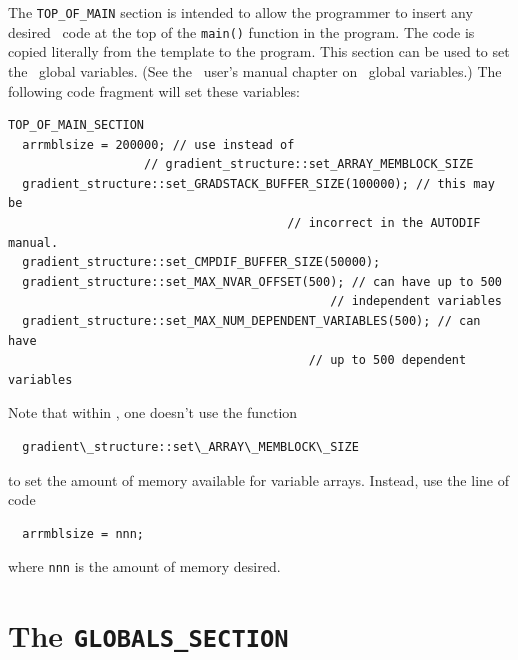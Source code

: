 \documentclass{admbmanual}
\begin{document}
The \texttt{TOP\_OF\_MAIN} section is intended to allow the programmer to insert any desired
\cplus\ code at the top of the \texttt{main()} function in the program. The code is copied
literally from the template to the program.  This section can be used to set
the \scAD\ global variables.  (See the \scAD\ user's manual chapter on
\scAD\ global variables.)  The following code fragment will set these
variables:
\begin{lstlisting}
TOP_OF_MAIN_SECTION
  arrmblsize = 200000; // use instead of 
                   // gradient_structure::set_ARRAY_MEMBLOCK_SIZE
  gradient_structure::set_GRADSTACK_BUFFER_SIZE(100000); // this may be 
                                       // incorrect in the AUTODIF manual.
  gradient_structure::set_CMPDIF_BUFFER_SIZE(50000); 
  gradient_structure::set_MAX_NVAR_OFFSET(500); // can have up to 500 
                                             // independent variables
  gradient_structure::set_MAX_NUM_DEPENDENT_VARIABLES(500); // can have  
                                          // up to 500 dependent variables
\end{lstlisting}

Note that within \ADM, one doesn't use the function
\begin{lstlisting}
  gradient\_structure::set\_ARRAY\_MEMBLOCK\_SIZE
\end{lstlisting}
to set the amount of memory available
for variable arrays. Instead, use the line of code
\begin{lstlisting}
  arrmblsize = nnn;
\end{lstlisting}
where \texttt{nnn} is the amount of memory desired.



\section{The \texttt{GLOBALS\_SECTION}}
\end{document}
